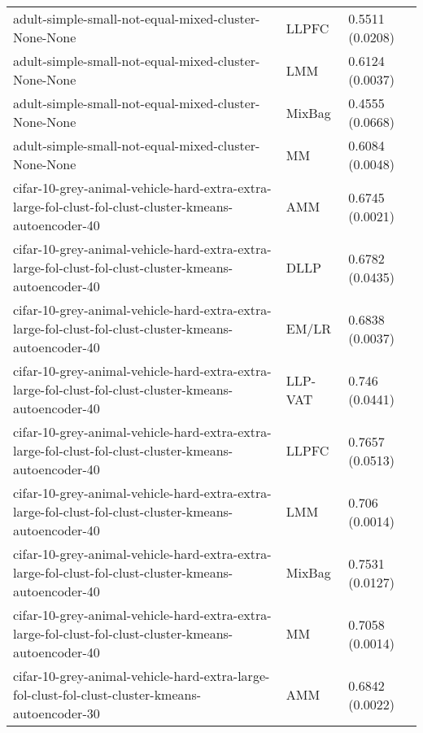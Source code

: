 \begin{longtable}{lll}
                                                         adult-simple-small-not-equal-mixed-cluster-None-None &     LLPFC &                           0.5511 (0.0208) \\
                                                         adult-simple-small-not-equal-mixed-cluster-None-None &       LMM &                           0.6124 (0.0037) \\
                                                         adult-simple-small-not-equal-mixed-cluster-None-None &    MixBag &                           0.4555 (0.0668) \\
                                                         adult-simple-small-not-equal-mixed-cluster-None-None &        MM &                           0.6084 (0.0048) \\
        cifar-10-grey-animal-vehicle-hard-extra-extra-large-fol-clust-fol-clust-cluster-kmeans-autoencoder-40 &       AMM &                           0.6745 (0.0021) \\
        cifar-10-grey-animal-vehicle-hard-extra-extra-large-fol-clust-fol-clust-cluster-kmeans-autoencoder-40 &      DLLP &                           0.6782 (0.0435) \\
        cifar-10-grey-animal-vehicle-hard-extra-extra-large-fol-clust-fol-clust-cluster-kmeans-autoencoder-40 &     EM/LR &                           0.6838 (0.0037) \\
        cifar-10-grey-animal-vehicle-hard-extra-extra-large-fol-clust-fol-clust-cluster-kmeans-autoencoder-40 &   LLP-VAT &                            0.746 (0.0441) \\
        cifar-10-grey-animal-vehicle-hard-extra-extra-large-fol-clust-fol-clust-cluster-kmeans-autoencoder-40 &     LLPFC &                           0.7657 (0.0513) \\
        cifar-10-grey-animal-vehicle-hard-extra-extra-large-fol-clust-fol-clust-cluster-kmeans-autoencoder-40 &       LMM &                            0.706 (0.0014) \\
        cifar-10-grey-animal-vehicle-hard-extra-extra-large-fol-clust-fol-clust-cluster-kmeans-autoencoder-40 &    MixBag &                           0.7531 (0.0127) \\
        cifar-10-grey-animal-vehicle-hard-extra-extra-large-fol-clust-fol-clust-cluster-kmeans-autoencoder-40 &        MM &                           0.7058 (0.0014) \\
              cifar-10-grey-animal-vehicle-hard-extra-large-fol-clust-fol-clust-cluster-kmeans-autoencoder-30 &       AMM &                           0.6842 (0.0022) \\

\end{longtable}
